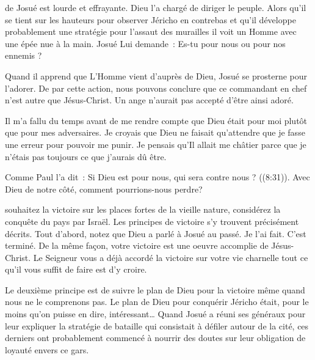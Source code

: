  de Josué est lourde et effrayante.
 Dieu l'a chargé de diriger le peuple.
 Alors qu'il se tient sur les hauteurs pour observer Jéricho en contrebas
 \ocadr et qu'il développe probablement une stratégie
 pour l'assaut des murailles \fcadr{}
 il voit un Homme avec une épée nue à la main.
 Josué Lui demande~: \og Es-tu pour nous ou pour nos ennemis ? \fg{}

Quand il apprend que L'Homme vient d'auprès de Dieu,
 Josué se prosterne pour l'adorer.
 De par cette action, nous pouvons conclure que ce commandant en chef
 n'est autre que Jésus-Christ. Un ange n'aurait pas accepté d'être ainsi adoré.

Il m'a fallu du temps avant de me rendre compte que Dieu
 était pour moi plutôt que pour mes adversaires.
 Je croyais que Dieu ne faisait qu'attendre
 que je fasse une erreur pour pouvoir me punir.
 Je pensais qu'Il allait me châtier
 parce que je n'étais pas toujours ce que j'aurais dû être.


Comme Paul l'a dit~:
 \og Si Dieu est pour nous, qui sera contre nous ? \fg{} ((8:31)).
 Avec Dieu de notre côté, comment pourrions-nous perdre? 

\dvrule






 souhaitez la victoire sur les places fortes
 de la vieille nature, considérez la conquête du pays par Israël.
 Les principes de victoire s'y trouvent précisément décrits.
 Tout d'abord, notez que Dieu a parlé à Josué au passé.
 \og Je l'ai fait. C'est terminé. \fg{}
 De la même façon, votre victoire est une oeuvre accomplie de Jésus-Christ.
 Le Seigneur vous a déjà accordé la victoire sur votre vie charnelle
 \ocadr tout ce qu'il vous suffit de faire est d'y croire.

Le deuxième principe est de suivre le plan de Dieu pour la victoire
 même quand nous ne le comprenons pas.
 Le plan de Dieu pour conquérir Jéricho était,
 pour le moins qu'on puisse en dire, intéressant\dots{}
 Quand Josué a réuni ses généraux pour leur expliquer
 la stratégie de bataille qui consistait à défiler autour de la cité,
 ces derniers ont probablement commencé à nourrir des doutes
 sur leur obligation de loyauté envers ce gars.


